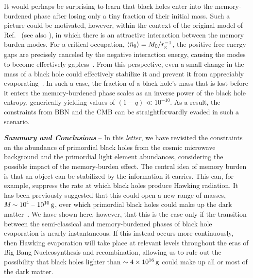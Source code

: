 \documentclass[aps, prl, reprint, preprintnumbers, showpacs, floatfix, nofootinbib, superscriptaddress, %
nofootinbib]{revtex4-1}
\begin{document}
It would perhaps be surprising to learn that black holes enter into the memory-burdened phase after losing only a tiny fraction of their initial mass. Such a picture could be motivated, however, within the context of the original model of Ref.~\cite{Dvali:2020wft} (see also \cite{Dvali:2017ktv, Dvali:2018tqi, Dvali:2018xpy, Dvali:2018ytn,Michel:2023ydf,Thoss:2024hsr,Dvali:2024hsb}), in which there is an attractive interaction between the memory burden modes. For a critical occupation, $\braket{\hat{n}_{0}} = M_{0} / r_{\rm g}^{-1}$, the positive free energy gaps are precisely canceled by the negative interaction energy, causing the modes to become effectively gapless~\cite{Dvali:2017ktv, Dvali:2018tqi, Dvali:2018xpy, Dvali:2018ytn, Dvali:2020wft}. From this perspective, even a small change in the mass of a black hole could effectively stabilize it and prevent it from appreciably evaporating~\cite{Dvali:2018xpy, Dvali:2018ytn, Dvali:2020wft, Dvali:2021tez, Dvali:2023xfz, Dvali:2024hsb}. In such a case, the fraction of a black hole's mass that is lost before it enters the memory-burdened phase scales as an inverse power of the black hole entropy, generically yielding values of $(1-q) \ll 10^{-10}$. As a result, the constraints from BBN and the CMB can be straightforwardly evaded in such a scenario. 
\vspace{1mm}



\textit{\textbf{Summary and Conclusions}} -- In this \textit{letter}, we have revisited the constraints on the abundance of primordial black holes from the cosmic microwave background and the primordial light element abundances, considering the possible impact of the memory-burden effect. The central idea of memory burden is that an object can be stabilized by the information it carries. This can, for example, suppress the rate at which black holes produce Hawking radiation. It has been previously suggested that this could open a new range of masses, $M \sim 10^{4}$ -- $10^{10}\,{\rm g}$, over which primordial black holes could make up the dark matter~\cite{Dvali:2020wft, Alexandre:2024nuo, Dvali:2024hsb, Thoss:2024hsr}. We have shown here, however, that this is the case only if the transition between the semi-classical and memory-burdened phases of black hole evaporation is nearly instantaneous. If this instead occurs more continuously, then Hawking evaporation will take place at relevant levels throughout the eras of Big Bang Nucleosynthesis and recombination, allowing us to rule out the possibility that black holes lighter than $\sim 4 \times 10^{16}\,{\rm g}$ could make up all or most of the dark matter.
\end{document}
